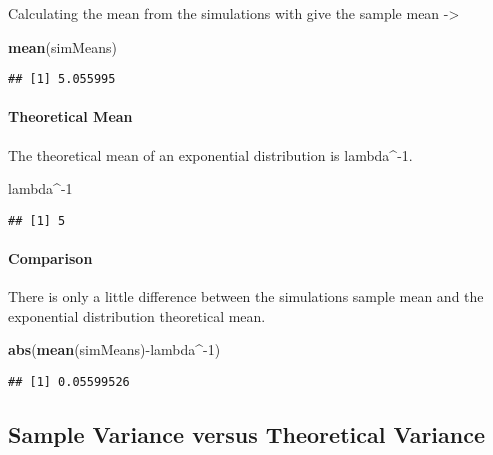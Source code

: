 \documentclass[]{article}
\newenvironment{Shaded}{\begin{snugshade}}{\end{snugshade}}
\newcommand{\KeywordTok}[1]{\textcolor[rgb]{0.13,0.29,0.53}{\textbf{{#1}}}}
\newcommand{\DecValTok}[1]{\textcolor[rgb]{0.00,0.00,0.81}{{#1}}}
\newcommand{\NormalTok}[1]{{#1}}
\let\oldparagraph\paragraph
\renewcommand{\paragraph}[1]{\oldparagraph{#1}\mbox{}}
\begin{document}
Calculating the mean from the simulations with give the sample mean
-\textgreater{}

\begin{Shaded}
\begin{Highlighting}[]
\KeywordTok{mean}\NormalTok{(simMeans)}
\end{Highlighting}
\end{Shaded}

\begin{verbatim}
## [1] 5.055995
\end{verbatim}

\paragraph{Theoretical Mean}\label{theoretical-mean}

The theoretical mean of an exponential distribution is lambda\^{}-1.

\begin{Shaded}
\begin{Highlighting}[]
\NormalTok{lambda^-}\DecValTok{1}
\end{Highlighting}
\end{Shaded}

\begin{verbatim}
## [1] 5
\end{verbatim}

\paragraph{Comparison}\label{comparison}

There is only a little difference between the simulations sample mean
and the exponential distribution theoretical mean.

\begin{Shaded}
\begin{Highlighting}[]
\KeywordTok{abs}\NormalTok{(}\KeywordTok{mean}\NormalTok{(simMeans)-lambda^-}\DecValTok{1}\NormalTok{)}
\end{Highlighting}
\end{Shaded}

\begin{verbatim}
## [1] 0.05599526
\end{verbatim}

\subsection{Sample Variance versus Theoretical
Variance}\label{sample-variance-versus-theoretical-variance}
\end{document}
